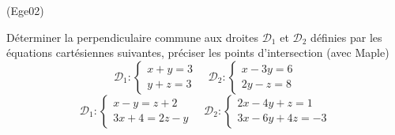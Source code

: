 \begin{tiny}(Ege02)\end{tiny}
D{\'e}terminer la perpendiculaire commune aux droites $\mathcal{D}_{1}
$ et $\mathcal{D}_{2}$ d{\'e}finies par les {\'e}quations
cart{\'e}siennes suivantes, pr{\'e}ciser les points d'intersection (avec Maple)
\[\mathcal{D}_{1} :\left\{
\begin{array}{c}
x+y=3 \\
y+z=3
\end{array}
\right. \quad \mathcal{D}_{2}:\left\{
\begin{array}{c}
x-3y=6 \\
2y-z=8
\end{array}
\right.  \]
\[\mathcal{D}_{1} :\left\{
\begin{array}{c}
x-y=z+2 \\
3x+4=2z-y
\end{array}
\right. \quad \mathcal{D}_{2}:\left\{
\begin{array}{c}
2x-4y+z=1 \\
3x-6y+4z=-3
\end{array}
\right.
\]
